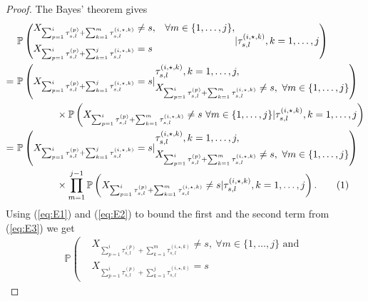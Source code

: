 \documentclass[twoside,11pt]{article}
\newcommand{\pow}[1]{^{(#1)}}%
\numberwithin{equation}{section}
\newcommand{\lp}{\left(}
\newcommand{\rp}{\right)}
\newcommand{\Pbb}{\mathbb{P}}
\newcommand\numberthis{\addtocounter{equation}{1}\tag{\theequation}}
\newcommand{\prob}{\Pbb}
\begin{document}
\begin{proof}
The Bayes' theorem gives
\begin{align*}
& \prob\lp             \begin{aligned}[c]
              &X_{\sum_{p=1}^i \tau_{s,l}\pow{p}
                  + \sum_{k=1}^{m}\tau_{s,l}\pow{i,\star,k}} \neq s,
                  &&\forall m \in \{1,\ldots,j\},\\
              &X_{\sum_{p=1}^i \tau_{s,l}\pow{p}
                  + \sum_{k=1}^j \tau_{s,l}\pow{i,\star,k}} = s
            \end{aligned} | \tau_{s,l}\pow{i,\star,k}, k=1, \ldots, j \rp \\
 = \ &  \prob\lp X_{\sum_{p=1}^i \tau_{s,l}\pow{p}+ \sum_{k=1}^j \tau_{s,l}\pow{i,\star,k}}=s|
 \begin{aligned}[c]
    & \tau_{s,l}\pow{i,\star,k},  k=1, \ldots, j, \\
    & X_{\sum_{p=1}^i \tau_ {s,l}\pow{p}+  \sum_{k=1}^m \tau_{s,l}\pow{i,\star,k}}\neq s, \ \forall m \in \{1, \ldots, j\}
 \end{aligned}
 \rp
\\
 & \qquad \qquad \times \prob\lp X_{\sum_{p=1}^i \tau_{s,l}\pow{p}+  \sum_{k=1}^m \tau_{s,l}\pow{i,\star,k}}\neq s \ \forall m \in \{1, \ldots, j\}|\tau_{s,l}\pow{i,\star,k}, k=1, \ldots, j\rp \\
 = \ & \prob\lp X_{\sum_{p=1}^i \tau_{s,l}\pow{p}+ \sum_{k=1}^j \tau_{s,l}\pow{i,\star,k}}=s|\begin{aligned}[c]
    & \tau_{s,l}\pow{i,\star,k},  k=1, \ldots, j, \\
    & X_{\sum_{p=1}^i \tau_ {s,l}\pow{p}+  \sum_{k=1}^m \tau_{s,l}\pow{i,\star,k}}\neq s, \ \forall m \in \{1, \ldots, j\}
 \end{aligned}\rp\\
  & \qquad \qquad \times \prod_{m=1}^{j-1} \prob\lp X_{\sum_{p=1}^i \tau_{s,l}\pow{p}+  \sum_{k=1}^m \tau_{s,l}\pow{i,\star,k}}\neq s |\tau_{s,l}\pow{i,\star,k}, k=1, \ldots, j\rp. \numberthis \label{eq:E3}\\
\end{align*}
Using (\ref{eq:E1}) and (\ref{eq:E2}) to bound the first and the second term from (\ref{eq:E3}) we get
\begin{align*}
    \prob\lp \begin{aligned}
        & X_{\sum_{p=1}^i \tau_{s,l}\pow{p}+  \sum_{k=1}^m \tau_{s,l}\pow{i,\star,k}}\neq s, \ \forall m \in \{1, \ldots, j\} \text{ and } \\ & X_{\sum_{p=1}^i \tau_{s,l}\pow{p}+ \sum_{k=1}^j \tau_{s,l}\pow{i,\star,k}}=s

\end{aligned}
\end{align*}
\end{proof}
\end{document}
